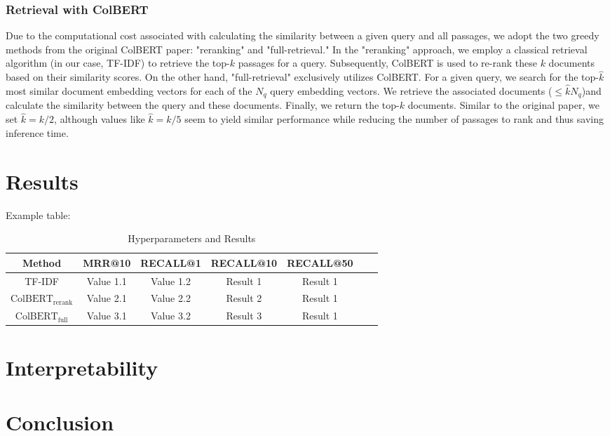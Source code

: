 \documentclass{article}
\begin{document}
\subsubsection{Retrieval with ColBERT}
Due to the computational cost associated with calculating the similarity between a given query and all passages, we adopt the two greedy methods from the original ColBERT paper: "reranking" and "full-retrieval." In the "reranking" approach, we employ a classical retrieval algorithm (in our case, TF-IDF) to retrieve the top-$k$ passages for a query. Subsequently, ColBERT is used to re-rank these $k$ documents based on their similarity scores. On the other hand, "full-retrieval" exclusively utilizes ColBERT. For a given query, we search for the top-$\hat{k}$ most similar document embedding vectors for each of the $N_q$ query embedding vectors. We retrieve the associated documents ($\leq \hat{k}N_q$)and calculate the similarity between the query and these documents. Finally, we return the top-$k$ documents. Similar to the original paper, we set $\hat{k} = k / 2$, although values like $\hat{k} = k / 5$ seem to yield similar performance while reducing the number of passages to rank and thus saving inference time.

\section{Results}


Example table:
\begin{table}[htbp]
    \centering
    \label{tab:hyperparameters}
    \begin{tabular}{ccccccc}
      \toprule
      \textbf{Method} & \textbf{MRR@10}  & \textbf{RECALL@1} & \textbf{RECALL@10} & \textbf{RECALL@50} \\
      \midrule
      TF-IDF & Value 1.1 & Value 1.2 & Result 1  & Result 1 \\
      $\text{ColBERT}_\text{rerank}$ & Value 2.1 & Value 2.2 & Result 2 & Result 1 \\
      $\text{ColBERT}_\text{full}$ & Value 3.1 & Value 3.2 & Result 3 & Result 1 \\
      \bottomrule
    \end{tabular}
    \caption{Hyperparameters and Results}
\end{table}

\section{Interpretability}

\section{Conclusion}



\end{document}
